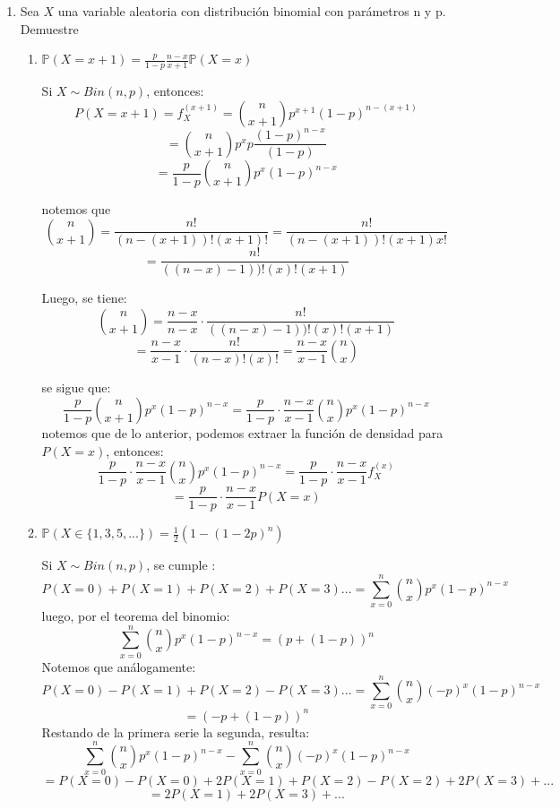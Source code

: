 \documentclass[11pt,a4paper]{report}
\begin{document}
\begin{enumerate}
		\item{
			Sea $X$ una variable aleatoria con distribución binomial con
			parámetros n y p. Demuestre
			\begin{enumerate}
				\item {
					$\mathbb{P}(X = x + 1) = \frac{p}{1 - p} \frac{n - x}{x + 1}
					 \mathbb{P}(X = x)$

					Si $X \sim Bin(n, p)$, entonces:
						$$ P(X = x + 1) = f_X^{(x + 1)}
						   = {n \choose x + 1}p^{x+1}(1-p)^{n - (x + 1) }  $$
						$$ = {n \choose x + 1}p^xp
							 \frac{(1-p)^{n - x}}{(1 - p)} $$
						$$ = \frac{p}{1 - p}{n \choose x + 1}p^x (1-p)^{n - x}$$

					notemos que
						$$ {n \choose x + 1} = \frac{n!}{(n-(x +1))! (x+1)!}
					      = \frac{n!}{(n-(x +1))! (x+1)x!}$$
						$$ = \frac{n!}{((n- x) - 1))! (x)! (x+1)} $$

					Luego, se tiene:
						$$ {n \choose x + 1} = \frac{n - x}{n - x} \cdot
						   \frac{n!}{((n- x) - 1))! (x)! (x+1)}
						   $$
						$$ = \frac{n - x}{x - 1} \cdot \frac{n!}{(n-x)! (x)!}
						   = \frac{n - x}{x - 1} {n \choose x} $$

					se sigue que:
						$$ \frac{p}{1 - p}{n \choose x + 1}p^x (1-p)^{n - x}
						   = \frac{p}{1 - p} \cdot \frac{n - x}{x - 1}
						     {n \choose x} p^x (1-p)^{n - x}$$
					notemos que de lo anterior, podemos extraer la función de
					densidad para $P(X = x)$, entonces:
						$$ \frac{p}{1 - p} \cdot \frac{n - x}{x - 1}
						  {n \choose x} p^x (1-p)^{n - x}
						  = \frac{p}{1-p} \cdot \frac{n - x}{x - 1} f_X^{(x)}$$
						$$ = \frac{p}{1-p} \cdot \frac{n - x}{x - 1} P(X = x)$$
				}

				\item {
					$\mathbb{P}(X \in \{ 1,3,5,...\}) = \frac{1}{2}
					 (1 - (1 - 2p)^n)$

					Si $X \sim Bin(n, p)$, se cumple :
						$$ P(X = 0) + P(X = 1) + P(X = 2) + P(X = 3) ...
						   = \sum_{x = 0}^{n} {n \choose x}p^x(1 - p)^{n - x}$$
					luego, por el teorema del binomio:
						$$ \sum_{x = 0}^{n} {n \choose x}p^x(1 - p)^{n - x}
						   = (p + (1 - p))^n$$
					Notemos que análogamente:
						$$ P(X = 0) - P(X = 1) + P(X = 2) - P(X = 3) ...
						   = \sum_{x = 0}^{n}{n \choose x}(-p)^x(1-p)^{n-x}$$
						$$ = (- p + (1 - p))^n $$
					Restando de la primera serie la segunda, resulta:
						$$ \sum_{x = 0}^{n} {n \choose x}p^x(1 - p)^{n - x}
						 - \sum_{x = 0}^{n}{n \choose x}(-p)^x(1-p)^{n - x} $$
						$$ = P(X = 0) - P(X = 0) + 2P(X = 1) +
							 P(X = 2) - P(X = 2) + 2P(X = 3) + ...$$
						$$ = 2 P(X = 1) + 2 P(X = 3) + ...$$

}
\end{enumerate}}
\end{enumerate}
\end{document}
